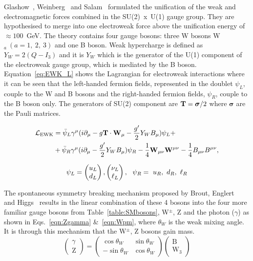 Glashow~\cite{Glashow:1961tr}, Weinberg~\cite{PhysRevLett.19.1264} and Salam~\cite{Salam:1968rm} formulated the unification of the weak and electromagnetic forces combined in the SU(2)~x~U(1) gauge group. They are hypothesised to merge into one electroweak force above the unification energy of $\approx 100$~GeV. The theory contains four gauge bosons: three W bosons W$_{a}~(a=1,~2,~3)$ and one B boson. Weak hypercharge is defined as $Y_{W} = 2(Q-I_{3})$ and it is $Y_W$ which is the generator of the U(1) component of the electroweak gauge group, which is mediated by the B boson. Equation~\ref{eq:EWK_L} shows the Lagrangian for electroweak interactions where it can be seen that the left-handed fermion fields, represented in the doublet $\psi_{L}$, couple to the W and B bosons and the right-handed fermion fields, $\psi_{R}$, couple to the B boson only. The generators of SU(2) component are ${\bf T} = \boldsymbol{\sigma}/2$ where $\boldsymbol{\sigma}$ are the Pauli matrices.

\begin{equation}
\label{eq:EWK_L}
\begin{split}
\mathcal{L}_\textrm{EWK} & = \bar{\psi}_L \gamma^\mu ( i\partial_\mu  - g \mathbf{T} \cdot \mathbf{W}_\mu - \frac{g'}{2} Y_{W}
B_\mu) \psi_L + \\ & + \bar{\psi}_R \gamma^\mu (i \partial_\mu - \frac{g'}{2} Y_{W} B_\mu) \psi_R -
\frac{1}{4}\mathbf{W}_{\mu\nu} \mathbf{W}^{\mu\nu} -\frac{1}{4}B_{\mu\nu} B^{\mu\nu},
\end{split}
\end{equation}

\begin{equation*}
\psi_L = \begin{pmatrix} u_L \\ d_L \end{pmatrix}, \begin{pmatrix} \nu_L \\ \ell_L \end{pmatrix},~~\psi_R=~u_R,~d_R,~\ell_R
\end{equation*}

The spontaneous symmetry breaking mechanism proposed by Brout, Englert~\cite{PhysRevLett.13.321} and Higgs~\cite{PhysRevLett.13.508} results in the linear combination of these 4 bosons into the four more familiar gauge bosons from Table~\ref{table:SMbosons}, W$^{\pm}$, Z and the photon ($\gamma$) as shown in Eqs.~\ref{eqn:Zgamma} \&~\ref{eqn:Wpm}, where $\theta_{W}$ is the weak mixing angle. It is through this mechanism that the W$^{\pm}$, Z bosons gain mass.
\begin{equation}
\label{eqn:Zgamma}
{\begin{pmatrix}
\gamma \\
\textrm{Z} 
\end{pmatrix}}
=
{\begin{pmatrix}
\cos\theta_{W} & \sin\theta_{W} \\
-\sin\theta_{W} & \cos\theta_{W} 
\end{pmatrix}}
{\begin{pmatrix}
\textrm {B} \\
\textrm{W}_{3}
\end{pmatrix}}
\end{equation}

